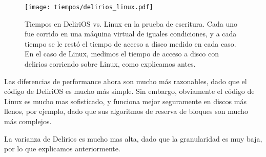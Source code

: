 \begin{figure}[H]
  \centering
  \texttt{[image: tiempos/delirios\_linux.pdf]}
  \caption{Tiempos en DeliriOS vs. Linux en la prueba de escritura. Cada uno fue corrido en una máquina virtual de iguales condiciones, y a cada tiempo se le restó el tiempo de acceso a disco medido en cada caso. En el caso de Linux, medimos el tiempo de acceso a disco con delirios corriendo sobre Linux, como explicamos antes.}
\end{figure}

Las diferencias de performance ahora son mucho más razonables, dado que el código de DeliriOS es mucho más simple. Sin embargo, obviamente el código de Linux es mucho mas sofisticado, y funciona mejor seguramente en discos más llenos, por ejemplo, dado que sus algoritmos de reserva de bloques son mucho más complejos.

La varianza de Delirios es mucho mas alta, dado que la granularidad es muy baja, por lo que explicamos anteriormente.

